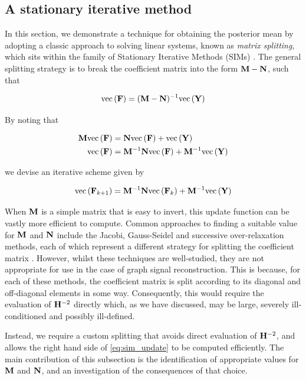 \subsection{A stationary iterative method}

\label{sec:SIM}

In this section, we demonstrate a technique for obtaining the posterior mean by adopting a classic approach to solving linear systems, known as \textit{matrix splitting}, which sits within the family of Stationary Iterative Methods (SIMs) \citep{Saad2003}. The general splitting strategy is to break the coefficient matrix into the form $\mathbf{M} - \mathbf{N}$, such that 


\begin{equation}
    \text{\textup{vec}}\left(\mathbf{F}\right) = (\mathbf{M} - \mathbf{N})^{-1} \text{\textup{vec}}\left(\mathbf{Y}\right)
\end{equation}

By noting that

\begin{align}
    \mathbf{M} \text{\textup{vec}}\left(\mathbf{F}\right) &= \mathbf{N} \text{\textup{vec}}\left(\mathbf{F}\right) + \text{\textup{vec}}\left(\mathbf{Y}\right) \\
    \text{\textup{vec}}\left(\mathbf{F}\right) &= \mathbf{M}^{-1}\mathbf{N} \text{\textup{vec}}\left(\mathbf{F}\right) + \mathbf{M}^{-1} \text{\textup{vec}}\left(\mathbf{Y}\right)
\end{align}

we devise an iterative scheme given by 

\begin{equation}
    \label{eq:sim_update}
    \text{\textup{vec}}\left(\mathbf{F}_{k+1}\right) = \mathbf{M}^{-1}\mathbf{N} \text{\textup{vec}}\left(\mathbf{F}_{k}\right) + \mathbf{M}^{-1} \text{\textup{vec}}\left(\mathbf{Y}\right)
\end{equation}


When $\mathbf{M}$ is a simple matrix that is easy to invert, this update function can be vastly more efficient to compute. Common approaches to finding a suitable value for $\mathbf{M}$ and $\mathbf{N}$ include the Jacobi, Gauss-Seidel and successive over-relaxation methods, each of which represent a different strategy for splitting the coefficient matrix \citep{Saad2003}. However, whilst these techniques are well-studied, they are not appropriate for use in the case of graph signal reconstruction. This is because, for each of these methods, the coefficient matrix is split according to its diagonal and off-diagonal elements in some way. Consequently, this would require the evaluation of $\mathbf{H}^{-2}$ directly which, as we have discussed, may be large, severely ill-conditioned and possibly ill-defined. 


Instead, we require a custom splitting that avoids direct evaluation of $\mathbf{H}^{-2}$, and allows the right hand side of \cref{eq:sim_update} to be computed efficiently. The main contribution of this subsection is the identification of appropriate values for $\mathbf{M}$ and $\mathbf{N}$, and an investigation of the consequences of that choice. 

